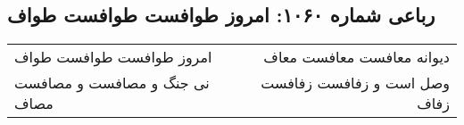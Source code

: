 \begin{center}
\section*{رباعی شماره ۱۰۶۰: امروز طوافست طوافست طواف}
\label{sec:1060}
\begin{longtable}{l p{0.5cm} r}
امروز طوافست طوافست طواف
&&
دیوانه معافست معافست معاف
\\
نی جنگ و مصافست و مصافست مصاف
&&
وصل است و زفافست زفافست زفاف
\\
\end{longtable}
\end{center}
